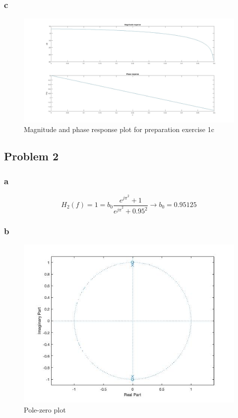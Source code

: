 \documentclass[a4paper,11pt]{article}
\begin{document}
\subsubsection{c}
\begin{figure}[H]
    \hspace{-40pt}\includegraphics[scale=0.28]{./images/prep-1c.jpg}
    \caption{Magnitude and phase response plot for preparation exercise 1c}
    \label{fig:my_label}
\end{figure}

\subsection{Problem 2}
\subsubsection{a}
\[
H_{2}(f) = 1 =  b_0\frac{e^{j\pi}^2 + 1}{e^{j\pi}^2 + 0.95^2} \xrightarrow{} b_0 = 0.95125
\]
\subsubsection{b}
\begin{figure}[H]
    \centering
    \hspace{-60pt}\includegraphics[scale = 0.6]{./images/p2-pz.jpg}
    \caption{Pole-zero plot}
\end{figure}
\end{document}
